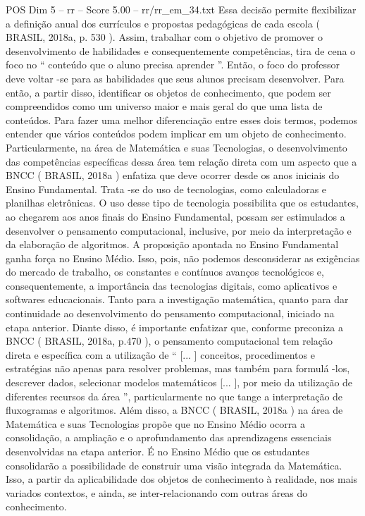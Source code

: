\begin{textsample}{POS Dim 5 – rr – Score 5.00 – rr/rr\_em\_34.txt}
Essa decisão permite flexibilizar a definição anual dos currículos e propostas pedagógicas de cada escola ( BRASIL, 2018a, p. 530 ).
Assim, trabalhar com o objetivo de promover o desenvolvimento de habilidades e consequentemente competências, tira de cena o foco no “ conteúdo que o aluno precisa aprender ”.
Então, o foco do professor deve voltar -se para as habilidades que seus alunos precisam desenvolver.
Para então, a partir disso, identificar os objetos de conhecimento, que podem ser compreendidos como um universo maior e mais geral do que uma lista de conteúdos.
Para fazer uma melhor diferenciação entre esses dois termos, podemos entender que vários conteúdos podem implicar em um objeto de conhecimento.
Particularmente, na área de Matemática e suas Tecnologias, o desenvolvimento das competências específicas dessa área tem relação direta com um aspecto que a BNCC ( BRASIL, 2018a ) enfatiza que deve ocorrer desde os anos iniciais do Ensino Fundamental.
Trata -se do uso de tecnologias, como calculadoras e planilhas eletrônicas.
O uso desse tipo de tecnologia possibilita que os estudantes, ao chegarem aos anos finais do Ensino Fundamental, possam ser estimulados a desenvolver o pensamento computacional, inclusive, por meio da interpretação e da elaboração de algoritmos.
A proposição apontada no Ensino Fundamental ganha força no Ensino Médio.
Isso, pois, não podemos desconsiderar as exigências do mercado de trabalho, os constantes e contínuos avanços tecnológicos e, consequentemente, a importância das tecnologias digitais, como aplicativos e softwares educacionais.
Tanto para a investigação matemática, quanto para dar continuidade ao desenvolvimento do pensamento computacional, iniciado na etapa anterior.
Diante disso, é importante enfatizar que, conforme preconiza a BNCC ( BRASIL, 2018a, p.470 ), o pensamento computacional tem relação direta e específica com a utilização de “ [... ] conceitos, procedimentos e estratégias não apenas para resolver problemas, mas também para formulá -los, descrever dados, selecionar modelos matemáticos [... ], por meio da utilização de diferentes recursos da área ”, particularmente no que tange a interpretação de fluxogramas e algoritmos.
Além disso, a BNCC ( BRASIL, 2018a ) na área de Matemática e suas Tecnologias propõe que no Ensino Médio ocorra a consolidação, a ampliação e o aprofundamento das aprendizagens essenciais desenvolvidas na etapa anterior.
É no Ensino Médio que os estudantes consolidarão a possibilidade de construir uma visão integrada da Matemática.
Isso, a partir da aplicabilidade dos objetos de conhecimento à realidade, nos mais variados contextos, e ainda, se inter-relacionando com outras áreas do conhecimento.

\end{textsample}
